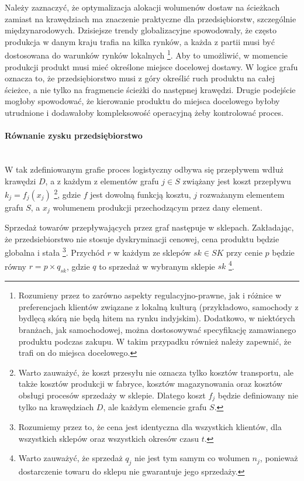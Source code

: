 \documentclass[polish, twoside, 12pt, a4paper]{article}
\theoremstyle{definition}
\theoremstyle{plain}
\theoremstyle{remark}
\begin{document}
Należy zaznaczyć, że optymalizacja alokacji wolumenów dostaw na ścieżkach zamiast na krawędziach ma znaczenie praktyczne dla przedsiębiorstw, szczególnie międzynarodowych. Dzisiejsze trendy globalizacyjne spowodowały, że często produkcja w danym kraju trafia na kilka rynków, a każda z partii musi być dostosowana do warunków rynków lokalnych \footnote{Rozumieny przez to zarówno aspekty regulacyjno-prawne, jak i różnice w preferencjach klientów związane z lokalną kulturą (przykładowo, samochody z bydlęcą skórą nie będą hitem na rynku indyjskim). Dodatkowo, w niektórych branżach, jak samochodowej, można dostosowywać specyfikację zamawianego produktu podczas zakupu. W takim przypadku również należy zapewnić, że trafi on do miejsca docelowego.}. Aby to umożliwić, w momencie produkcji produkt musi mieć określone miejsce docelowej dostawy. W logice grafu oznacza to, że przedsiębiorstwo musi z góry określić ruch produktu na całej ścieżce, a nie tylko na fragmencie ścieżki do następnej krawędzi. Drugie podejście mogłoby spowodować, że kierowanie produktu do miejsca docelowego byłoby utrudnione i dodawałoby kompleksowość operacyjną żeby kontrolować proces. 

\paragraph{Równanie zysku przedsiębiorstwo}\mbox{}\\

W tak zdefiniowanym grafie proces logistyczny odbywa się przepływem wdłuż krawędzi $D$, a z każdym z elementów grafu $ j \in S$ zwiążany jest koszt przepływu $k_ j = f_j(x_j)$ \footnote{Warto zauważyć, że koszt przesyłu nie oznacza tylko kosztów transportu, ale także kosztów produkcji w fabryce, kosztów magazynowania oraz kosztów obsługi procesów sprzedaży w sklepie. Dlatego koszt $f_j$ będzie definiowany nie tylko na krawędziach $D$, ale każdym elemencie grafu $S$.}, gdzie $f$ jest dowolną funkcją kosztu, $j$ rozważanym elementem grafu $S$, a $x_j$ wolumenem produkcji przechodzącym przez dany element. 

Sprzedaż towarów przepływających przez graf następuje w sklepach. Zakładając, że przedsiebiorstwo nie stosuje dyskryminacji cenowej, cena produktu będzie globalna i stała \footnote{Rozumiemy przez to, że cena jest identyczna dla wszystkich klientów, dla wszystkich sklepów oraz wszystkich okresów czasu $t$.}. Przychód $r$ w każdym ze sklepów $sk \in SK$ przy cenie $p$ będzie równy $r = p \times q_{sk}$, gdzie $q$ to sprzedaż w wybranym sklepie $sk$ \footnote{Warto zauważyć, że sprzedaż $q_j$ nie jest tym samym co wolumen $n_j$, ponieważ dostarczenie towaru do sklepu nie gwarantuje jego sprzedaży.}. 
\end{document}
